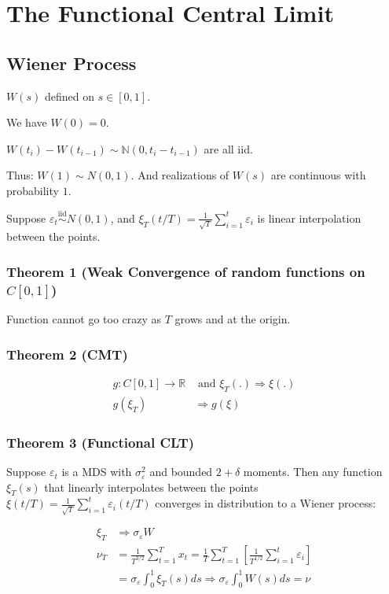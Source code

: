 \section{The Functional Central Limit}

\subsection{Wiener Process}

$W(s)$ defined on $s\in[0,1]$. 

We have $W(0)=0$.

$W\left(t_i\right)-W\left(t_{i-1}\right) \sim \mathbb{N}\left(0, t_i-t_{i-1}\right)$ are all iid.

Thus: $W(1) \sim N(0,1)$. And realizations of $W(s)$ are continuous with probability $1$.

Suppose $\varepsilon_t \stackrel{\text{iid}}{\sim}N(0,1)$, and $\xi_T(t / T)=\frac{1}{\sqrt{T}} \sum_{i=1}^t \varepsilon_i$ is linear interpolation between the points.

\subsubsection{Theorem 1 (Weak Convergence of random functions on $C[0,1]$)}

Function cannot go too crazy as $T$ grows and at the origin.

\subsubsection{Theorem 2 (CMT)}

\begin{align*}
    g: C[0,1] \rightarrow \mathbb{R} &\text{ and } \xi_T(.) \Rightarrow \xi(.) \\
    g\left(\xi_T\right) &\Rightarrow g(\xi)
\end{align*}

\subsubsection{Theorem 3 (Functional CLT)}

Suppose $\varepsilon_t$ is a MDS with $\sigma^2_\varepsilon$ and bounded $2+\delta$ moments.
Then any function $\xi_T(s)$ that linearly interpolates between the points $\xi(t/T) = \frac{1}{\sqrt{T}}\sum\limits_{i=1}^t \varepsilon_i(t/T)$ converges in distribution to a Wiener process:

\begin{align*}
    \xi_T &\Rightarrow \sigma_\varepsilon W \\
    \nu_T &=\frac{1}{T^{3 / 2}} \sum_{t=1}^T x_t=\frac{1}{T} \sum_{t=1}^T\left[\frac{1}{T^{1 / 2}} \sum_{i=1}^t \varepsilon_i\right] \\
    &=\sigma_{\varepsilon} \int_0^1 \xi_T(s) d s \Rightarrow \sigma_{\varepsilon} \int_0^1 W(s) d s=\nu
\end{align*}

